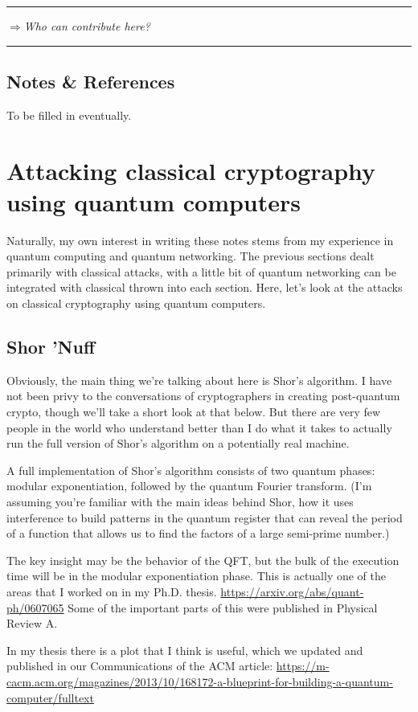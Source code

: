 \documentclass[%
 aip,
 jmp,%
 amsmath,amssymb,
 reprint,%
]{revtex4-1}
\def\outlinecomment#1{\hrule{\color{Blue}$\Rightarrow${\small\em #1}}\hrule}
\begin{document}
\outlinecomment{Who can contribute here?}

\subsection{Notes \& References}

To be filled in eventually.

\section{Attacking classical cryptography using quantum computers}

Naturally, my own interest in writing these notes stems from my
experience in quantum computing and quantum networking.  The previous
sections dealt primarily with classical attacks, with a little bit of
quantum networking can be integrated with classical thrown into each
section.  Here, let's look at the attacks on classical cryptography
using quantum computers.

\subsection{Shor 'Nuff}

Obviously, the main thing we're talking about here is Shor's
algorithm.  I have not been privy to the conversations of
cryptographers in creating post-quantum crypto, though we'll take a
short look at that below.  But there are very few people in the world
who understand better than I do what it takes to actually run the full
version of Shor's algorithm on a potentially real machine.

A full implementation of Shor's algorithm consists of two quantum
phases: modular exponentiation, followed by the quantum Fourier
transform.  (I'm assuming you're familiar with the main ideas behind
Shor, how it uses interference to build patterns in the quantum
register that can reveal the period of a function that allows us to
find the factors of a large semi-prime number.)

The key insight may be the behavior of the QFT, but the bulk of the
execution time will be in the modular exponentiation phase.  This is
actually one of the areas that I worked on in my Ph.D. thesis.
\url{https://arxiv.org/abs/quant-ph/0607065}
Some of the important parts of this were published in Physical Review
A.

In my thesis there is a plot that I think is useful, which we updated
and published in our Communications of the ACM article:
\url{https://m-cacm.acm.org/magazines/2013/10/168172-a-blueprint-for-building-a-quantum-computer/fulltext}
\end{document}
